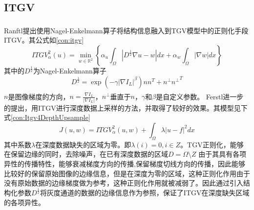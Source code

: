 \documentclass[UTF8]{ctexart}
\newcommand{\myciteup}[1]{\textsuperscript{\textsuperscript{\cite{#1}}}}
\begin{document}
\begin{sloppypar}
    \subsection{ITGV}
    Ranftl\myciteup{Ranftl2012}提出使用Nagel-Enkelmann算子\myciteup{Nagel1986}将结构信息融入到TGV模型中的正则化手段ITGV。其公式如\eqref{con:itgv}
    \begin{equation}
        ITGV^{2}_{\alpha}(u) = \min\limits_{w \in \mathbb{R}^2}\left\{ \alpha_u \int_{\Omega}\left|D^\frac{1}{2} \nabla u - w \right|dx + \alpha_w\int_{\Omega}\left|\nabla w\right|dx \right\}
        \label{con:itgv}
    \end{equation}
    其中的$D^{\frac{1}{2}}$为Nagel-Enkelmann算子
    \begin{equation}
        D^{\frac{1}{2}} = \exp{\left(-\gamma \left| \nabla I_L  \right|^{\beta}  \right)}nn^T+n^\perp{n^\perp}^T
        \label{con:nagel-EnkelmannOp}
    \end{equation}
    $n$是图像梯度的方向，$n=\frac{\nabla I_L}{\left| \nabla I_L \right|}$，$n^\perp$垂直于$n$，$\gamma$和$\beta$是自定义参数。
    Ferstl\myciteup{Ferstl2013}进一步的提出，用ITGV进行深度数据上采样的方法，并取得了较好的效果。其模型见下式\eqref{con:Itgv4DepthUpsample}
    \begin{equation}
        J(u,w) = ITGV^2_{\alpha}(u,w) + \int_{\Omega}\lambda\left| u-f \right|^2 dx
        \label{con:Itgv4DepthUpsample}
    \end{equation}
    其中系数$\lambda$在深度数据缺失的区域为零。即$\lambda(i) = 0, i\in Z$。TGV正则化，能够在保留边缘的同时，去除噪声，在已有深度数据的区域$D=\Omega\setminus Z$ 由于其具有各项异性的传播特性，能够衰减梯度方向的传播,保留梯度切线方向的传播，因此能够比较好的保留原始图像的边缘信息，但是在深度为零的区域，这种正则化作用由于没有原始数据的边缘梯度做为参考，这种正则化作用就被减弱了。因此通过引入结构化参数$D^{\frac{1}{2}}$将灰度通道的数据的边缘信息作为参照，保证了ITGV在深度缺失区域的各项异性。\par


\end{sloppypar}
\end{document}
